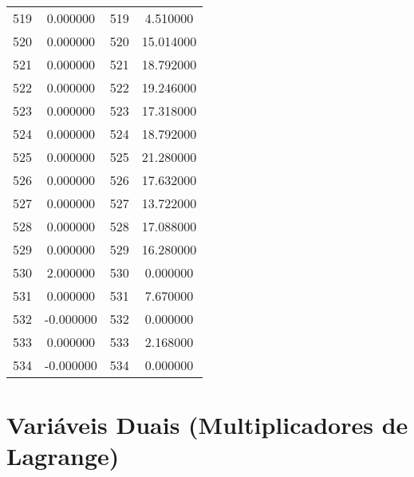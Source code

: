 \documentclass[12pt]{article}
\begin{document}
\begin{longtable}{@{}cccc@{}}
519 & 0.000000 & 519 & 4.510000 \\
520 & 0.000000 & 520 & 15.014000 \\
521 & 0.000000 & 521 & 18.792000 \\
522 & 0.000000 & 522 & 19.246000 \\
523 & 0.000000 & 523 & 17.318000 \\
524 & 0.000000 & 524 & 18.792000 \\
525 & 0.000000 & 525 & 21.280000 \\
526 & 0.000000 & 526 & 17.632000 \\
527 & 0.000000 & 527 & 13.722000 \\
528 & 0.000000 & 528 & 17.088000 \\
529 & 0.000000 & 529 & 16.280000 \\
530 & 2.000000 & 530 & 0.000000 \\
531 & 0.000000 & 531 & 7.670000 \\
532 & -0.000000 & 532 & 0.000000 \\
533 & 0.000000 & 533 & 2.168000 \\
534 & -0.000000 & 534 & 0.000000 \\

\end{longtable}

\section{Variáveis Duais (Multiplicadores de Lagrange)}
\end{document}
